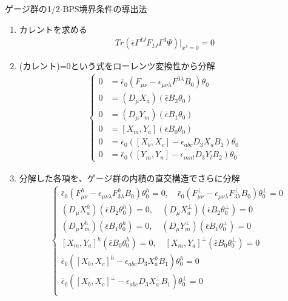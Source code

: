 \documentclass[dvipdfmx,a4paper,10.5pt]{article}
\numberwithin{equation}{section}
\begin{document}
\begin{setupbox}{ゲージ群の1/2-BPS境界条件の導出法}
\begin{enumerate}
    \item カレントを求める
    \begin{align*}
        Tr(\bar{\epsilon}\Gamma^{IJ}F_{IJ}\Gamma^{3}\Psi)|_{x^{3}=0}=0
    \end{align*}
    \item (カレント)=0という式をローレンツ変換性から分解
    \begin{align*}      
        \begin{cases}
             0&=\bar{\epsilon}_{0}(F_{\mu\nu}-\epsilon_{\mu\nu\lambda}F^{3\lambda}B_{0})\theta_{0}\\
    0&=(D_{\mu}X_{a})(\bar{\epsilon}B_{2}\theta_{0})\\
    0&=(D_{\mu}Y_{m})(\bar{\epsilon}B_{1}\theta_{0})\\
    0&=[X_{m},Y_{a}](\bar{\epsilon}B_{0}\theta_{0})\\
    0&=\bar{\epsilon}_{0}([X_{b},X_{c}]-\epsilon_{abc}D_{3}X_{a}B_{1})\theta_{0}\\
    0&=\bar{\epsilon}_{0}([Y_{m},Y_{n}]-\epsilon_{mnl}D_{3}Y_{l}B_{2})\theta_{0}
        \end{cases}
    \end{align*}
    \item 分解した各項を、ゲージ群の内積の直交構造でさらに分解
    \begin{align*}
        &\begin{cases}
            \bar{\epsilon}_{0}(F^{h}_{\mu\nu}-\epsilon_{\mu\nu\lambda}F_{3\lambda}^{h}B_{0})\theta_{0}^{h}=0,\quad
    \bar{\epsilon}_{0}(F^{\perp}_{\mu\nu}-\epsilon_{\mu\nu\lambda}F_{3\lambda}^{\perp}B_{0})\theta_{0}^{\perp}=0\\
    (D_{\mu}X_{a}^{h})(\bar{\epsilon}B_{2}\theta_{0}^{h})=0,\quad
    (D_{\mu}X_{a}^{\perp})(\bar{\epsilon}B_{2}\theta_{0}^{\perp})=0\\
    (D_{\mu}Y_{m}^{h})(\bar{\epsilon}B_{1}\theta_{0}^{h})=0,\quad
    (D_{\mu}Y_{m}^{\perp})(\bar{\epsilon}B_{1}\theta_{0}^{\perp})=0\\
    [X_{m},Y_{a}]^{h}(\bar{\epsilon}B_{0}\theta_{0}^{h})=0,
    \quad[X_{m},Y_{a}]^{\perp}(\bar{\epsilon}B_{0}\theta_{0}^{\perp})=0\\
    \bar{\epsilon}_{0}([X_{b},X_{c}]^{h}-\epsilon_{abc}D_{3}X_{a}^{h}B_{1})\theta_{0}^{h}=0\\
    \bar{\epsilon}_{0}([X_{b},X_{c}]^{\perp}-\epsilon_{abc}D_{3}X_{a}^{\perp}B_{1})\theta_{0}^{\perp}=0\\

\end{cases}
\end{align*}
\end{enumerate}
\end{setupbox}
\end{document}
